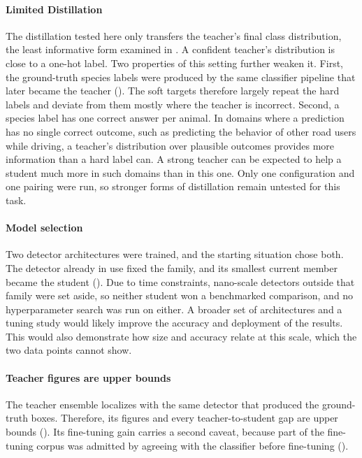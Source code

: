 \paragraph{Limited Distillation}
The distillation tested here only transfers the teacher's final class distribution, the least informative form examined in . A confident teacher's distribution is close to a one-hot label. Two properties of this setting further weaken it. First, the ground-truth species labels were produced by the same classifier pipeline that later became the teacher (). The soft targets therefore largely repeat the hard labels and deviate from them mostly where the teacher is incorrect. Second, a species label has one correct answer per animal. In domains where a prediction has no single correct outcome, such as predicting the behavior of other road users while driving, a teacher's distribution over plausible outcomes provides more information than a hard label can. A strong teacher can be expected to help a student much more in such domains than in this one. Only one configuration and one pairing were run, so stronger forms of distillation remain untested for this task.

\paragraph{Model selection}
Two detector architectures were trained, and the starting situation chose both. The detector already in use fixed the family, and its smallest current member became the student (). Due to time constraints, nano-scale detectors outside that family were set aside, so neither student won a benchmarked comparison, and no hyperparameter search was run on either. A broader set of architectures and a tuning study would likely improve the accuracy and deployment of the results. This would also demonstrate how size and accuracy relate at this scale, which the two data points cannot show.

\paragraph{Teacher figures are upper bounds}
The teacher ensemble localizes with the same detector that produced the ground-truth boxes. Therefore, its figures and every teacher-to-student gap are upper bounds (). Its fine-tuning gain carries a second caveat, because part of the fine-tuning corpus was admitted by agreeing with the classifier before fine-tuning ().

